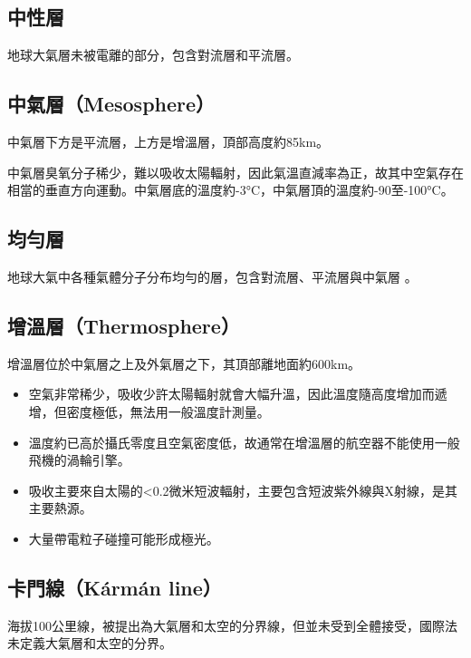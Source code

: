 \documentclass[a4paper,12pt]{report}
\begin{document}
\subsection{中性層}
地球大氣層未被電離的部分，包含對流層和平流層。
\subsection{中氣層（Mesosphere）}
中氣層下方是平流層，上方是增溫層，頂部高度約85km。

中氣層臭氧分子稀少，難以吸收太陽輻射，因此氣溫直減率為正，故其中空氣存在相當的垂直方向運動。中氣層底的溫度約-3°C，中氣層頂的溫度約-90至-100°C。
\subsection{均勻層}
地球大氣中各種氣體分子分布均勻的層，包含對流層、平流層與中氣層 。
\subsection{增溫層（Thermosphere）}
增溫層位於中氣層之上及外氣層之下，其頂部離地面約600km。
\begin{itemize}
\item 空氣非常稀少，吸收少許太陽輻射就會大幅升溫，因此溫度隨高度增加而遞增，但密度極低，無法用一般溫度計測量。
\item 溫度約已高於攝氏零度且空氣密度低，故通常在增溫層的航空器不能使用一般飛機的渦輪引擎。
\item 吸收主要來自太陽的<0.2微米短波輻射，主要包含短波紫外線與X射線，是其主要熱源。
\item 大量帶電粒子碰撞可能形成極光。
\end{itemize}
\subsection{卡門線（Kármán line）}
海拔100公里線，被提出為大氣層和太空的分界線，但並未受到全體接受，國際法未定義大氣層和太空的分界。
\end{document}
